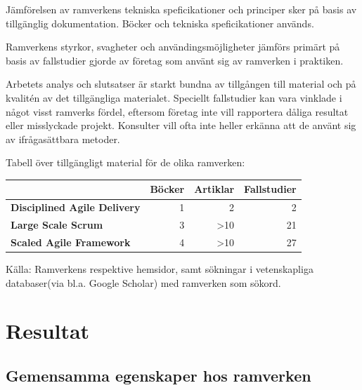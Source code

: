 	Jämförelsen av ramverkens tekniska speficikationer och principer sker på basis av tillgänglig dokumentation. Böcker och tekniska speficikationer används.
	\linebreak
	
	Ramverkens styrkor, svagheter och användingsmöjligheter jämförs primärt på basis av fallstudier gjorde av företag som använt sig av ramverken i praktiken.
	
	
	
	Arbetets analys och slutsatser är starkt bundna av tillgången till material och på kvalitén av det tillgängliga materialet. Speciellt fallstudier kan vara vinklade i något visst ramverks fördel, eftersom företag inte vill rapportera dåliga resultat eller misslyckade projekt. Konsulter vill ofta inte heller erkänna att de använt sig av ifrågasättbara metoder.
	
	
	Tabell över tillgängligt material för de olika ramverken:

	\begin{center}
	\begin{tabular}{ >{\bfseries}l | r | r | r }
		 	 						& Böcker & Artiklar & Fallstudier 	\\ \hline
		Disciplined Agile Delivery 	& 1 	& 2			& 2 			\\ \hline
		Large Scale Scrum 			& 3 	& >10		& 21 			\\ \hline
		Scaled Agile Framework 		& 4 	& >10		& 27 			\\ 
	\end{tabular}
	\end{center}
	
	Källa: Ramverkens respektive hemsidor\cite{dad_web, less_web, safe_web}, samt sökningar i vetenskapliga databaser(via bl.a. Google Scholar) med ramverken som sökord.
	
	
	
\newpage
\section{Resultat}
	
		
	
	\subsection{Gemensamma egenskaper hos ramverken}
		
